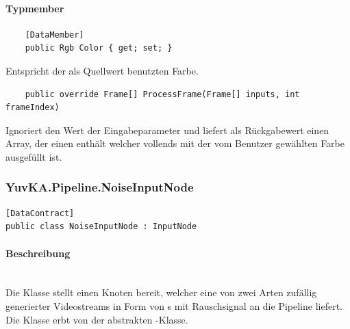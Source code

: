 \paragraph{Typmember}
\begin{itemize}

	\begin{verbatim}
	[DataMember]
	public Rgb Color { get; set; }
	\end{verbatim}
	Entspricht der als Quellwert benutzten Farbe.


	\begin{verbatim}
	public override Frame[] ProcessFrame(Frame[] inputs, int frameIndex)
	\end{verbatim}
	Ignoriert den Wert der Eingabeparameter und liefert als Rückgabewert einen Array, der einen  enthält welcher vollends mit der vom Benutzer gewählten Farbe ausgefüllt ist.

\end{itemize}

\subsubsection{YuvKA.Pipeline.NoiseInputNode}

\begin{verbatim}
[DataContract]
public class NoiseInputNode : InputNode
\end{verbatim}

\paragraph{Beschreibung}~\\
Die Klasse  stellt einen Knoten bereit, welcher eine von zwei Arten zufällig generierter Videostreams in Form von s mit Rauschsignal an die Pipeline liefert. Die Klasse erbt von der abstrakten -Klasse.


